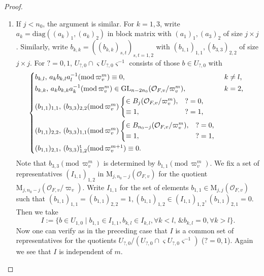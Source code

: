 \documentclass[12pt,oneside,reqno]{amsart}
\theoremstyle{plain}
\begin{document}
\begin{proof}
\begin{enumerate}
			
			
			
			\item 
			If
			$j<n_0$,
			the argument is similar.
			For $k=1,3$,
			write
			$a_k=\mathrm{diag}((a_k)_1,(a_k)_2)$ in block matrix
			with
			$(a_1)_1,(a_3)_2$ of size $j\times j$.
			Similarly, write
			$b_{k,k}=((b_{k,k})_{s,t})_{s,t=1,2}$
			with
			$(b_{1,1})_{1,1},
			(b_{3,3})_{2,2}$ of size
			$j\times j$.
			For
			$?=0,1$,
			$U_{?,0}\cap
			\varsigma
			U_{?,0}\varsigma^{-1}$
			consists of those $b\in U_{?,0}$ with
			\[
			\begin{cases*}
				b_{k,l},\,
				a_kb_{k,l}a_l^{-1}		
				(\mathrm{mod}\,\varpi_v^m)
				\equiv
				0,
				&
				$k\neq l$,
				\\
				b_{k,k},\,
				a_kb_{k,k}a_k^{-1}
				(\mathrm{mod}\,\varpi_v^m)
				\in
				\mathrm{GL}_{n-2n_0}(\mathcal{O}_{F,v}/\varpi_v^m),
				&
				$k=2$,
				\\
				(b_{1,1})_{1,1},\,
				(b_{3,3})_{2,2}
				(\mathrm{mod}\,\varpi_v^m)
				\begin{cases*}
					\in
					B_j
					(\mathcal{O}_{F,v}/\varpi_v^m),
					&
					$?=0$,
					\\
					\equiv1,
					&
					$?=1$,
				\end{cases*}
				&
				\\
				(b_{1,1})_{2,2},\,
				(b_{3,3})_{1,1}
				(\mathrm{mod}\,\varpi_v^m)
				\begin{cases*}
					\in
					B_{n_0-j}
					(\mathcal{O}_{F,v}/\varpi_v^m),
					&
					$?=0$,
					\\
					\equiv1,
					&
					$?=1$,
				\end{cases*}
				\\
				(b_{1,1})_{2,1},\,
				(b_{3,3})_{1,2}^\mathrm{t}
				(\mathrm{mod}\,\varpi_v^{m+1})
				\equiv
				0.
				&
			\end{cases*}
			\]
			Note that
			$b_{3,3}
			(\mathrm{mod}\,\varpi_v^m)$
			is determined by
			$b_{1,1}
			(\mathrm{mod}\,\varpi_v^m)$.
			We fix a set of representatives
			$(I_{1,1})_{1,2}$
			in
			$\mathrm{M}_{j,n_0-j}
			(\mathcal{O}_{F,v})$
			for the quotient
			$\mathrm{M}_{j,n_0-j}
			(\mathcal{O}_{F,v}/\varpi_v)$.
			Write
			$I_{1,1}$
			for the set of elements
			$b_{1,1}\in
			\mathrm{M}_{j,j}(\mathcal{O}_{F,v})$
			such that
			$(b_{1,1})_{1,1}=(b_{1,1})_{2,2}=1,
			(b_{1,1})_{1,2}\in (I_{1,1})_{1,2},
			(b_{1,1})_{2,1}=0$.
			Then we take
			\begin{equation}\label{set of representatives-2}
				I:=
				\{
				b\in
				U_{1,0}\mid 
				b_{1,1}\in I_{1,1},
				b_{k,l}\in I_{k,l},
				\forall
				k<l,
				\,
				\&
				b_{k,l}=0,
				\forall
				k>l
				\}.
			\end{equation}
			Now one can verify as in the preceding case that
			$I$ is a common set of representatives for the quotients
			$U_{?,0}/
			(U_{?,0}\cap
			\varsigma U_{?,0}\varsigma^{-1})$
			($?=0,1$).
			Again we see that $I$ is independent of
			$m$.
		\end{enumerate}
	\end{proof}
	
\end{document}
